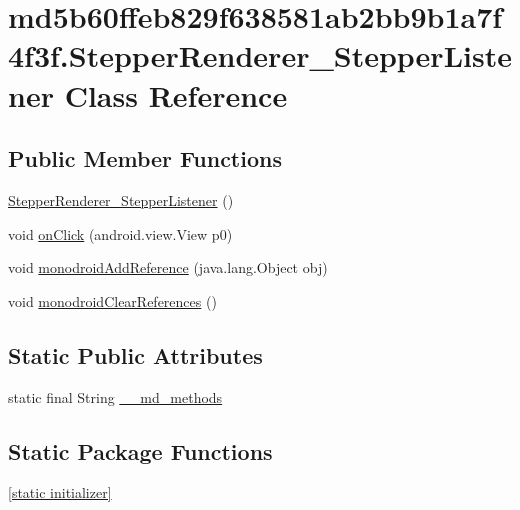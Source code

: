 \hypertarget{classmd5b60ffeb829f638581ab2bb9b1a7f4f3f_1_1_stepper_renderer___stepper_listener}{
\section{md5b60ffeb829f638581ab2bb9b1a7f4f3f.StepperRenderer\_\-StepperListener Class Reference}
\label{classmd5b60ffeb829f638581ab2bb9b1a7f4f3f_1_1_stepper_renderer___stepper_listener}
}
\subsection*{Public Member Functions}
\begin{CompactItemize}
\item 
\hyperlink{classmd5b60ffeb829f638581ab2bb9b1a7f4f3f_1_1_stepper_renderer___stepper_listener_a5be37bc90ed0315ea45de354057b0ab}{StepperRenderer\_\-StepperListener} ()
\item 
void \hyperlink{classmd5b60ffeb829f638581ab2bb9b1a7f4f3f_1_1_stepper_renderer___stepper_listener_e013c0b5135d142b2c9092cba4e62af7}{onClick} (android.view.View p0)
\item 
void \hyperlink{classmd5b60ffeb829f638581ab2bb9b1a7f4f3f_1_1_stepper_renderer___stepper_listener_ca2b5ea54afcdc9bbf86f2ca4d46b151}{monodroidAddReference} (java.lang.Object obj)
\item 
void \hyperlink{classmd5b60ffeb829f638581ab2bb9b1a7f4f3f_1_1_stepper_renderer___stepper_listener_ac50e9b6e66f8dcc19a5b7dfe491dad0}{monodroidClearReferences} ()
\end{CompactItemize}
\subsection*{Static Public Attributes}
\begin{CompactItemize}
\item 
static final String \hyperlink{classmd5b60ffeb829f638581ab2bb9b1a7f4f3f_1_1_stepper_renderer___stepper_listener_477983b1cb4ddb1d26a31bca1d1d5f02}{\_\-\_\-md\_\-methods}
\end{CompactItemize}
\subsection*{Static Package Functions}
\begin{CompactItemize}
\item 
\hyperlink{classmd5b60ffeb829f638581ab2bb9b1a7f4f3f_1_1_stepper_renderer___stepper_listener_a586850c09feb56b672ba0c4f94c8946}{\mbox{[}static initializer\mbox{]}}
\end{CompactItemize}
